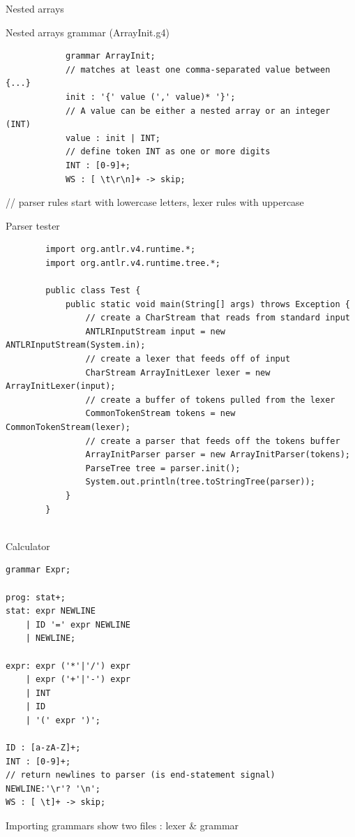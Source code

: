 \documentclass{beamer}
\begin{document}
\begin{frame}[fragile]{Nested arrays}
	
	\begin{exampleblock}{Nested arrays grammar (ArrayInit.g4)}
		\begin{verbatim}
			grammar ArrayInit;
			// matches at least one comma-separated value between {...}
			init : '{' value (',' value)* '}';
			// A value can be either a nested array or an integer (INT)
			value : init | INT;
			// define token INT as one or more digits
			INT : [0-9]+;
			WS : [ \t\r\n]+ -> skip;
		\end{verbatim}
	\end{exampleblock}
				// parser rules start with lowercase letters, lexer rules with uppercase
\end{frame}

\begin{frame}[fragile]{Parser tester}
	\footnotesize\begin{verbatim}
		import org.antlr.v4.runtime.*;
		import org.antlr.v4.runtime.tree.*;
		
		public class Test { 
		    public static void main(String[] args) throws Exception { 
		        // create a CharStream that reads from standard input 
		        ANTLRInputStream input = new ANTLRInputStream(System.in);
		        // create a lexer that feeds off of input 
		        CharStream ArrayInitLexer lexer = new ArrayInitLexer(input);
		        // create a buffer of tokens pulled from the lexer 
		        CommonTokenStream tokens = new CommonTokenStream(lexer);
		        // create a parser that feeds off the tokens buffer 
		        ArrayInitParser parser = new ArrayInitParser(tokens);
		        ParseTree tree = parser.init();
		        System.out.println(tree.toStringTree(parser));
		    } 
		}
		
	\end{verbatim}
\end{frame}

\begin{frame}[fragile]{Calculator}
\footnotesize\begin{lstlisting}
grammar Expr;

prog: stat+;
stat: expr NEWLINE
    | ID '=' expr NEWLINE
    | NEWLINE;

expr: expr ('*'|'/') expr
    | expr ('+'|'-') expr
    | INT
    | ID
    | '(' expr ')';

ID : [a-zA-Z]+;
INT : [0-9]+;
// return newlines to parser (is end-statement signal)
NEWLINE:'\r'? '\n';
WS : [ \t]+ -> skip;
\end{lstlisting}
\end{frame}

\begin{frame}{Importing grammars}
	show two files : lexer \& grammar
\end{frame}

\end{document}
